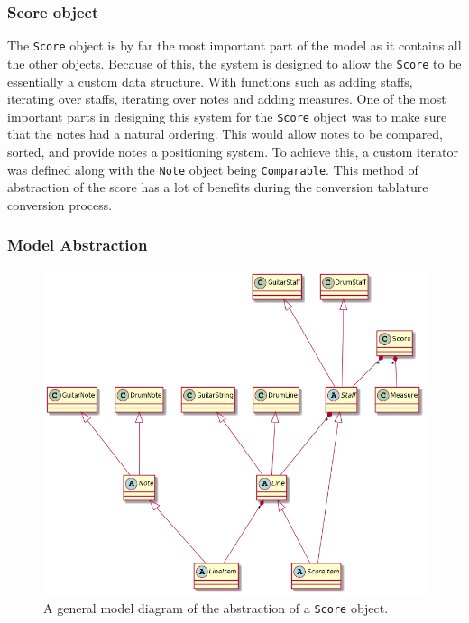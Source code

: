 \documentclass[11pt]{article}
\begin{document}
\subsubsection{Score object}
\label{sec:org0d15aab}
The \texttt{Score} object is by far the most important part of the model as it contains all the other objects. Because of this, the system is designed to allow the \texttt{Score} to be essentially a custom data structure. With functions such as adding staffs, iterating over staffs, iterating over notes and
adding measures. One of the most important parts in designing this system for the \texttt{Score} object was to make sure that the notes had a natural ordering. This would allow notes to be compared, sorted, and provide notes a positioning system. To achieve this, a custom iterator was defined along with the \texttt{Note} object being \texttt{Comparable}. This method of abstraction of the score has a lot of benefits during the conversion tablature conversion process.

\newpage

\subsubsection{Model Abstraction}
\label{sec:org4ea9a8e}
\begin{figure}[htbp]
\centering
\includegraphics[width=.9\linewidth]{./Diagrams/backend-model-abstraction.png}
\caption{A general model diagram of the abstraction of a \texttt{Score} object.}
\end{figure}

\newpage
\end{document}
